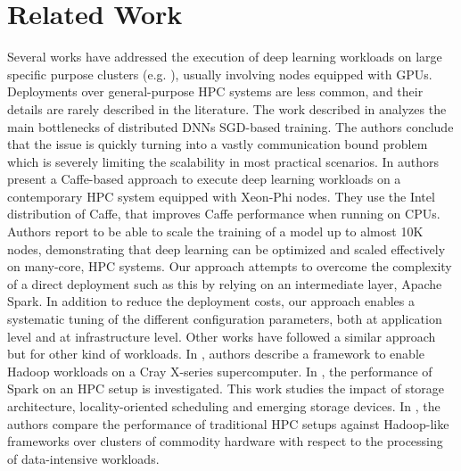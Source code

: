 \documentclass[journal]{IEEEtran}
\begin{document}


\section{Related Work}
\label{sec:rw}

Several works have addressed the execution of deep learning workloads on large specific purpose clusters (e.g. \cite{DBLP:journals/corr/abs-1708-02983}), usually involving nodes equipped with GPUs. Deployments over general-purpose HPC systems are less common, and their details are rarely described in the literature. The work described in \cite{DBLP:conf/sc/KeuperP16} analyzes the main bottlenecks of distributed DNNs SGD-based training. The authors conclude that the issue is quickly turning into a vastly communication bound problem which is severely limiting the scalability in most practical scenarios. In \cite{DBLP:journals/corr/abs-1708-05256} authors present a Caffe-based approach to execute deep learning workloads on a contemporary HPC system equipped with Xeon-Phi nodes. They use the Intel distribution of Caffe, that improves Caffe performance when running on CPUs. Authors report to be able to scale the training of a model up to almost 10K nodes, demonstrating that deep learning can be optimized and scaled effectively on many-core, HPC systems. Our approach attempts to overcome the complexity of a direct deployment such as this by relying on an intermediate layer, Apache Spark. In addition to reduce the deployment costs, our approach enables a systematic tuning of the different configuration parameters, both at application level and at infrastructure level. Other works have followed a similar approach but for other kind of workloads. In \cite{michael2014}, authors describe a framework to enable Hadoop workloads on a Cray X-series supercomputer. In \cite{wang2014}, the performance of Spark on an HPC setup is investigated. This work studies the impact of storage architecture, locality-oriented scheduling and emerging storage devices. In \cite{jha2014}, the authors compare the performance of traditional HPC setups against Hadoop-like frameworks over clusters of commodity hardware with respect to the processing of data-intensive workloads. 


\end{document}
